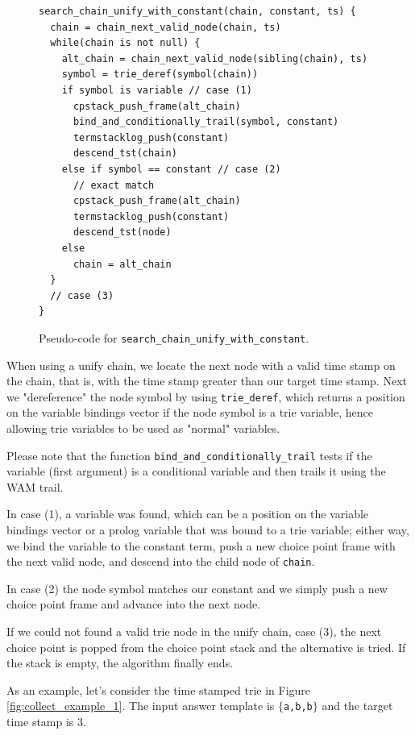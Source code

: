 \begin{figure}[ht]
\begin{Verbatim}
search_chain_unify_with_constant(chain, constant, ts) {
  chain = chain_next_valid_node(chain, ts)
  while(chain is not null) {
    alt_chain = chain_next_valid_node(sibling(chain), ts)
    symbol = trie_deref(symbol(chain))
    if symbol is variable // case (1)
      cpstack_push_frame(alt_chain)
      bind_and_conditionally_trail(symbol, constant)
      termstacklog_push(constant)
      descend_tst(chain)
    else if symbol == constant // case (2)
      // exact match
      cpstack_push_frame(alt_chain)
      termstacklog_push(constant)
      descend_tst(node)
    else
      chain = alt_chain
  }
  // case (3)
}
\end{Verbatim}
\caption{Pseudo-code for \texttt{search\_chain\_unify\_with\_constant}.}
\label{fig:search_chain_unify_with_constant}
\end{figure}

When using a unify chain, we locate the next node with a valid time stamp on the chain, that is, with the time stamp greater than our target time stamp. Next we "dereference" the node symbol by using
\texttt{trie\_deref}, which returns a position on the variable bindings vector if the node symbol is a trie variable, hence allowing trie variables to be used as "normal" variables.

Please note that the function \texttt{bind\_and\_conditionally\_trail} tests if the variable (first argument) is a conditional variable and then trails it using the WAM trail.

In case (1), a variable was found, which can be a position on the variable bindings vector or a prolog variable that was bound to a trie variable; either way, we bind the variable to the constant term, push a new choice point frame with the next valid node, and descend into the child node of \texttt{chain}.

In case (2) the node symbol matches our constant and we simply push a new choice point frame and advance into the next node.

If we could not found a valid trie node in the unify chain, case (3), the next choice point is popped from the choice point stack and the alternative is tried. If the stack is empty, the algorithm finally ends.

As an example, let's consider the time stamped trie in Figure \ref{fig:collect_example_1}. The input answer template is $\{$\texttt{a,b,b}$\}$ and the target time stamp is 3.

